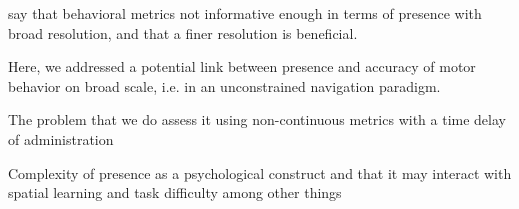 say that behavioral metrics not informative enough in terms of presence with broad resolution, and that a finer resolution is beneficial.

Here, we addressed a potential link between presence and accuracy of motor behavior on broad scale, i.e. in an unconstrained navigation paradigm. 

The problem that we do assess it using non-continuous metrics with a time delay of administration~\cite{gehrkeakman2019}

Complexity of presence as a psychological construct and that it may interact with spatial learning and task difficulty among other things~\cite{} %